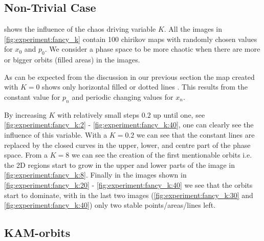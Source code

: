 \subsection{Non-Trivial Case}
\label{ss:b:nontrivial}
 shows the influence of the chaos driving variable $K$. All the images in \cref{fig:experiment:fancy_k} contain 100 chirikov maps with randomly chosen values for $x_0$ and $p_0$. We consider a phase space to be more chaotic when there are more or bigger orbits (filled areas) in the images. 

As can be expected from the discussion in our previous section the map created with $K = 0$ shows only horizontal filled or dotted lines . This results from the constant value for $p_n$ and periodic changing values for $x_n$. 

By increasing $K$ with relatively small steps $0.2$ up until one, see \cref{fig:experiment:fancy_k:2} - \ref{fig:experiment:fancy_k:40}, one can clearly see the influence of this variable. With a $K = 0.2$ we can see that the constant lines are replaced by the closed curves in the upper, lower, and centre part of the phase space. From a $K = 8$ we can see the creation of the first mentionable orbits i.e. the 2D regions start to grow in the upper and lower parts of the image in \cref{fig:experiment:fancy_k:8}.  Finally in the images shown in \cref{fig:experiment:fancy_k:20} - \ref{fig:experiment:fancy_k:40} we see that the orbits start to dominate, with in the last two images (\cref{fig:experiment:fancy_k:30} and \ref{fig:experiment:fancy_k:40}) only two stable points/areas/lines left. 




\subsection{KAM-orbits}
\label{ss:b:kam}
